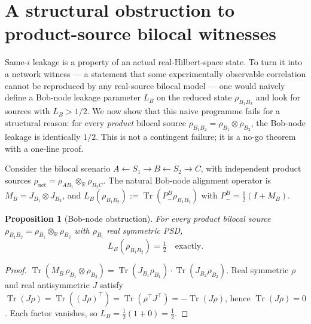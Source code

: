 \documentclass[a4paper,onecolumn,noarxiv]{quantumarticle}
\theoremstyle{plain}
\newtheorem{proposition}[theorem]{Proposition}
\theoremstyle{definition}
\theoremstyle{remark}
\newcommand{\R}{\mathbb{R}}
\newcommand{\Pminus}{P_{-}}
\newcommand{\Mop}{M}
\newcommand{\Tr}{\operatorname{Tr}}
\newcommand{\Lleak}{L}
\begin{document}
\section{A structural obstruction to product-source bilocal witnesses}
\label{sec:bobnode}

Same-$i$ leakage is a property of an actual real-Hilbert-space state. To turn it into
a network witness --- a statement that some experimentally observable correlation
cannot be reproduced by any real-source bilocal model --- one would naively define a
Bob-node leakage parameter $\Lleak_B$ on the reduced state $\rho_{B_1B_2}$ and look
for sources with $\Lleak_B>1/2$. We now show that this naive programme fails for a
structural reason: for every \emph{product} bilocal source
$\rho_{B_1B_2}=\rho_{B_1}\otimes\rho_{B_2}$, the Bob-node leakage is identically
$1/2$. This is not a contingent failure; it is a no-go theorem with a one-line proof.

Consider the bilocal scenario $A\leftarrow S_1\to B\leftarrow S_2\to C$, with
independent product sources $\rho_{\mathrm{net}}=\rho_{AB_1}\otimes_\R\rho_{B_2C}$.
The natural Bob-node alignment operator is $\Mop_B=J_{B_1}\otimes J_{B_2}$, and
$\Lleak_B(\rho_{B_1B_2}):=\Tr(\Pminus^B\rho_{B_1B_2})$ with
$\Pminus^B=\tfrac{1}{2}(I+\Mop_B)$.

\begin{proposition}[Bob-node obstruction]
\label{prop:bobnode}
For every product bilocal source $\rho_{B_1B_2}=\rho_{B_1}\otimes_\R\rho_{B_2}$
with $\rho_{B_i}$ real symmetric PSD,
\begin{equation}
  \Lleak_B(\rho_{B_1B_2}) = \tfrac{1}{2}\quad\text{exactly.}
\end{equation}
\end{proposition}

\begin{proof}
$\Tr(\Mop_B\,\rho_{B_1}\otimes\rho_{B_2})=\Tr(J_{B_1}\rho_{B_1})\cdot\Tr(J_{B_2}\rho_{B_2})$.
Real symmetric $\rho$ and real antisymmetric $J$ satisfy
$\Tr(J\rho)=\Tr((J\rho)^\top)=\Tr(\rho^\top J^\top)=-\Tr(J\rho)$,
hence $\Tr(J\rho)=0$. Each factor vanishes, so
$\Lleak_B=\tfrac{1}{2}(1+0)=\tfrac{1}{2}$.
\end{proof}
\end{document}
